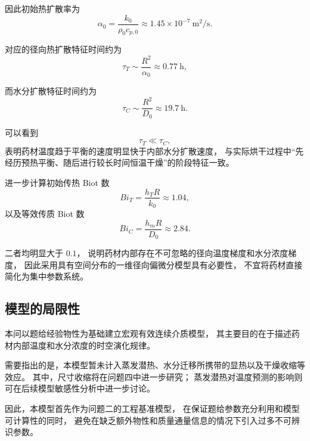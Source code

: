 \documentclass[UTF8,a4paper,12pt]{ctexart}
\begin{document}
因此初始热扩散率为
\begin{equation}
\alpha_0
=
\frac{k_0}{\rho_0c_{p,0}}
\approx
1.45\times10^{-7}~\mathrm{m^2/s}.
\end{equation}

对应的径向热扩散特征时间约为
\begin{equation}
\tau_T
\sim
\frac{R^2}{\alpha_0}
\approx
0.77~\mathrm{h},
\end{equation}

而水分扩散特征时间约为
\begin{equation}
\tau_C
\sim
\frac{R^2}{D_0}
\approx
19.7~\mathrm{h}.
\end{equation}

可以看到
\begin{equation}
\tau_T\ll\tau_C,
\end{equation}
表明药材温度趋于平衡的速度明显快于内部水分扩散速度，
与实际烘干过程中“先经历预热平衡、随后进行较长时间恒温干燥”的阶段特征一致。

进一步计算初始传热 Biot 数
\begin{equation}
Bi_T
=
\frac{h_TR}{k_0}
\approx1.04,
\end{equation}
以及等效传质 Biot 数
\begin{equation}
Bi_C
=
\frac{h_mR}{D_0}
\approx2.84.
\end{equation}

二者均明显大于 $0.1$，
说明药材内部存在不可忽略的径向温度梯度和水分浓度梯度，
因此采用具有空间分布的一维径向偏微分模型具有必要性，
不宜将药材直接简化为集中参数系统。

\subsection{模型的局限性}

本问以题给经验物性为基础建立宏观有效连续介质模型，
其主要目的在于描述药材内部温度和水分浓度的时空演化规律。

需要指出的是，本模型暂未计入蒸发潜热、水分迁移所携带的显热以及干燥收缩等效应。
其中，尺寸收缩将在问题四中进一步研究；
蒸发潜热对温度预测的影响则可在后续模型敏感性分析中进一步讨论。

因此，本模型首先作为问题二的工程基准模型，
在保证题给参数充分利用和模型可计算性的同时，
避免在缺乏额外物性和质量通量信息的情况下引入过多不可辨识参数。
\end{document}
